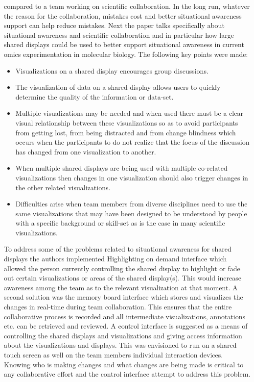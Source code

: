 \documentclass{sig-alternate}
\begin{document}
compared to a team working on scientific collaboration. In the long run,
whatever the reason for the collaboration, mistakes cost and better situational
awareness support can help reduce mistakes. 
Next the paper talks specifically about situational awareness and scientific
collaboration and in particular how large shared displays could be used to 
better support situational awareness in current omics experimentation in 
molecular biology. The following key points were made:
\begin{itemize}
  \item Visualizations on a shared display encourages group discussions.
  \item The visualization of data on a shared display allows users to quickly
  determine the quality of the information or data-set.
  \item Multiple visualizations may be needed and when used there must be a
  clear visual relationship between these visualizations so as to avoid
  participants from getting lost, from being distracted and from change blindness
  which occurs when the participants to do not realize that the focus of the
  discussion has changed from one visualization to  another.
  \item When multiple shared displays are being used with multiple
  co-related visualizations then changes in one visualization should also trigger
  changes in the other related visualizations.
  \item Difficulties arise when team members from diverse disciplines need to 
  use the same visualizations that may have been designed to be understood by
  people with a specific background or skill-set as is the case in many
  scientific visualizations.
\end{itemize}
To address some of the problems related to situational awareness for shared
displays the authors implemented Highlighting on demand interface which allowed
the person currently controlling the shared display to highlight or fade out
certain visualizations or areas of the shared display(s). This would increase
awareness among the team as to the relevant visualization at that moment. A
second solution was the memory board interface which stores and visualizes the 
changes in real-time during team collaboration. This ensures that the entire
collaborative process is recorded and all intermediate visualizations,
annotations etc. can be retrieved and reviewed. A control interface is
suggested as a means of controlling the shared displays and visualizations and
giving access information about the visualizations and displays. This
was envisioned to run on a shared touch screen as well on the team members
individual interaction devices. Knowing who is making changes and what changes
are being made is critical to any collaborative effort and the control interface
attempt to address this problem.
\end{document}
